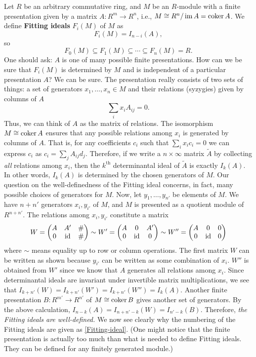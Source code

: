 Let $R$ be an arbitrary commutative ring, and $M$ be an $R$-module 
with a finite presentation given by a matrix $A: R^m \to R^n$, i.e., $M \cong R^n/\mathop{\mathrm{im}}\nolimits A = \mathop{\mathrm{coker}}\nolimits A$.
We define {\bf Fitting ideals} $F_i(M)$ of $M$ as
\begin{equation}
 F_i(M) = I_{n-i}(A),
\label{Fitting-ideal}
\end{equation}
so
\[
 F_0(M) \subseteq F_1(M) \subseteq \cdots \subseteq F_n(M) = R .
\]
One should ask: $A$ is one of many possible finite presentations.
How can we be sure that $F_i(M)$ is determined by $M$ and is independent of a particular presentation $A$?
We can be sure.
The presentation really consists of two sets of things:
a set of generators $x_1,\ldots,x_n \in M$ and their relations (syzygies) given by columns of $A$
\[
 \sum_{i} x_i A_{ij} = 0.
\]
Thus, we can think of $A$ as the matrix of relations.
The isomorphism $M \cong \mathop{\mathrm{coker}}\nolimits A$ ensures that any possible relations among $x_i$ is generated by columns of $A$.
That is, for any coefficients $c_i$ such that $\sum_i x_i c_i = 0$ we can express $c_i$ as $c_i = \sum_j  A_{ij} d_j$.
Therefore, if we write a $n \times \infty$ matrix $\tilde A$ by collecting \emph{all} relations among $x_i$,
then the $k^\text{th}$ determinantal ideal of $\tilde A$ is exactly $I_k(A)$.
In other words, $I_k(A)$ is determined by the chosen generators of $M$.
Our question on the well-definedness of the Fitting ideal concerns, in fact, many possible choices of generators for $M$.
Now, let $y_1, \ldots, y_{n'}$ be elements of $M$.
We have $n+n'$ generators $x_i, y_{i'}$ of $M$,
and $M$ is presented as a quotient module of $R^{n+n'}$. 
The relations among $x_i,y_{i'}$ constitute a matrix
\[
W =
\begin{pmatrix}
 A & A'  & \# \\
 0 & \mathrm{id} & \# \\
\end{pmatrix} 
\sim
W' =
\begin{pmatrix}
 A & 0   & A' \\
 0 & \mathrm{id} & 0 \\
\end{pmatrix} 
\sim
W'' =
\begin{pmatrix}
 A & 0   & 0 \\
 0 & \mathrm{id} & 0 \\
\end{pmatrix} 
\]
where $\sim$ means equality up to row or column operations.
The first matrix $W$ can be written as shown because $y_{i'}$ can be written as some combination of $x_i$.
$W''$ is obtained from $W'$ since we know that $A$ generates all relations among $x_i$.
Since determinantal ideals are invariant under invertible matrix multiplications,
we see that $I_{k+n'}(W) = I_{k+n'}(W') = I_{k+n'}(W'') = I_k(A)$.
Another finite presentation $B : R^{m'} \to R^{n'}$ of $M \cong \mathop{\mathrm{coker}}\nolimits B$
gives another set of generators.
By the above calculation, $I_{n-k}(A) = I_{n+n'-k}(W) = I_{n'-k}(B)$.
Therefore, {\em the Fitting ideals are well-defined.}
We now see clearly why the numbering of the Fitting ideals are given as \eqref{Fitting-ideal}.
(One might notice that the finite presentation is actually too much than 
what is needed to define Fitting ideals. They can be defined for any finitely generated module.)


